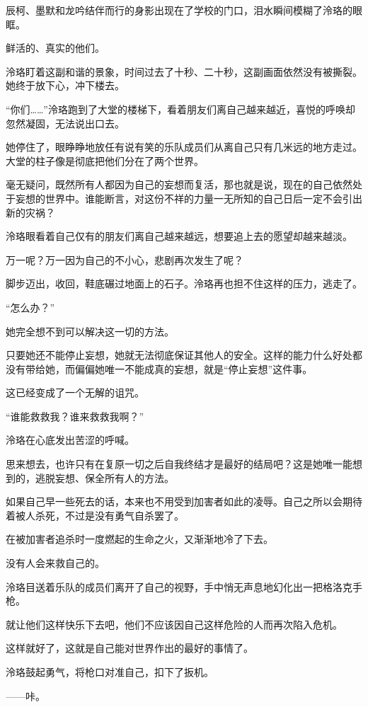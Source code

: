\documentclass[UTF8, scheme = chinese, openany]{ctexbook}
\begin{document}
辰柯、墨默和龙吟结伴而行的身影出现在了学校的门口，泪水瞬间模糊了泠珞的眼眶。

鲜活的、真实的他们。

泠珞盯着这副和谐的景象，时间过去了十秒、二十秒，这副画面依然没有被撕裂。她终于放下心，冲下楼去。

“你们……”泠珞跑到了大堂的楼梯下，看着朋友们离自己越来越近，喜悦的呼唤却忽然凝固，无法说出口去。

她停住了，眼睁睁地放任有说有笑的乐队成员们从离自己只有几米远的地方走过。大堂的柱子像是彻底把他们分在了两个世界。

毫无疑问，既然所有人都因为自己的妄想而复活，那也就是说，现在的自己依然处于妄想的世界中。谁能断言，对这份不祥的力量一无所知的自己日后一定不会引出新的灾祸？

泠珞眼看着自己仅有的朋友们离自己越来越远，想要追上去的愿望却越来越淡。

万一呢？万一因为自己的不小心，悲剧再次发生了呢？

脚步迈出，收回，鞋底碾过地面上的石子。泠珞再也担不住这样的压力，逃走了。

“怎么办？”

她完全想不到可以解决这一切的方法。

只要她还不能停止妄想，她就无法彻底保证其他人的安全。这样的能力什么好处都没有带给她，而偏偏她唯一不能成真的妄想，就是“停止妄想”这件事。

这已经变成了一个无解的诅咒。

“谁能救救我？谁来救救我啊？”

泠珞在心底发出苦涩的呼喊。

思来想去，也许只有在复原一切之后自我终结才是最好的结局吧？这是她唯一能想到的，逃脱妄想、保全所有人的方法。

如果自己早一些死去的话，本来也不用受到加害者如此的凌辱。自己之所以会期待着被人杀死，不过是没有勇气自杀罢了。

在被加害者追杀时一度燃起的生命之火，又渐渐地冷了下去。

没有人会来救自己的。

泠珞目送着乐队的成员们离开了自己的视野，手中悄无声息地幻化出一把格洛克手枪。

就让他们这样快乐下去吧，他们不应该因自己这样危险的人而再次陷入危机。

这样就好了，这就是自己能对世界作出的最好的事情了。

泠珞鼓起勇气，将枪口对准自己，扣下了扳机。

\vspace{1.5em}

——咔。
\end{document}
